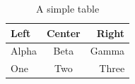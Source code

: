 \documentclass{article}
\begin{document}
\begin{table}
\begin{tabular}{l c r}
Left & Center & Right \\
\hline
Alpha & Beta & Gamma \\
One & Two & Three \\
\end{tabular}
\caption{A simple table}\label{tab:example}
\end{table}
\end{document}
